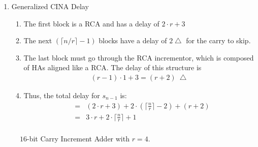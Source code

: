 \documentclass[times, twocolumn, 10pt]{article}
\begin{document}
\begin{enumerate}
\begin{enumerate}
\begin{enumerate}
\end{enumerate}
\item Generalized CINA Delay
\begin{enumerate}
\item The first block is a RCA and has a delay of $2 \cdot r + 3$
  \item The next $(\lceil n/r \rceil - 1)$ blocks have a delay of 
    $2 \bigtriangleup$  for the carry to skip. 
\item The last block must go through the RCA incrementor, which is composed
  of HAs aligned like a RCA.  The delay of this structure is
\begin{eqnarray*}
(r-1) \cdot 1 + 3 = (r + 2)~\bigtriangleup
\end{eqnarray*}
\item Thus, the total delay for $s_{n-1}$ is:
  \begin{eqnarray*}
    & = & (2 \cdot r + 3) + 2 \cdot (\lceil \frac{n}{r} \rceil - 2) + (r + 2)
    \\
    & = & 3 \cdot r + 2 \cdot \lceil \frac{n}{r} \rceil + 1
    \\
  \end{eqnarray*}
\end{enumerate}
\end{enumerate}
\begin{figure*} [p]
  \begin{center}
    \setlength{\unitlength}{0.0105in}%
  \end{center}
  \label{cina16.fig}
  \caption{$16$-bit Carry Increment Adder with $r=4$.}
\end{figure*}


\end{enumerate}
\end{document}
